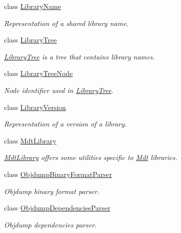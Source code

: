 \begin{DoxyCompactItemize}
class \hyperlink{class_mdt_1_1_deploy_utils_1_1_library_name}{Library\+Name}
\begin{DoxyCompactList}\small\item\em Representation of a shared library name. \end{DoxyCompactList}\item 
class \hyperlink{class_mdt_1_1_deploy_utils_1_1_library_tree}{Library\+Tree}
\begin{DoxyCompactList}\small\item\em \hyperlink{class_mdt_1_1_deploy_utils_1_1_library_tree}{Library\+Tree} is a tree that contains library names. \end{DoxyCompactList}\item 
class \hyperlink{class_mdt_1_1_deploy_utils_1_1_library_tree_node}{Library\+Tree\+Node}
\begin{DoxyCompactList}\small\item\em Node identifier used in \hyperlink{class_mdt_1_1_deploy_utils_1_1_library_tree}{Library\+Tree}. \end{DoxyCompactList}\item 
class \hyperlink{class_mdt_1_1_deploy_utils_1_1_library_version}{Library\+Version}
\begin{DoxyCompactList}\small\item\em Representation of a version of a library. \end{DoxyCompactList}\item 
class \hyperlink{class_mdt_1_1_deploy_utils_1_1_mdt_library}{Mdt\+Library}
\begin{DoxyCompactList}\small\item\em \hyperlink{class_mdt_1_1_deploy_utils_1_1_mdt_library}{Mdt\+Library} offers some utilities specific to \hyperlink{namespace_mdt}{Mdt} libraries. \end{DoxyCompactList}\item 
class \hyperlink{class_mdt_1_1_deploy_utils_1_1_objdump_binary_format_parser}{Objdump\+Binary\+Format\+Parser}
\begin{DoxyCompactList}\small\item\em Objdump binary format parser. \end{DoxyCompactList}\item 
class \hyperlink{class_mdt_1_1_deploy_utils_1_1_objdump_dependencies_parser}{Objdump\+Dependencies\+Parser}
\begin{DoxyCompactList}\small\item\em Objdump dependencies parser. \end{DoxyCompactList}\item 

\end{DoxyCompactItemize}
